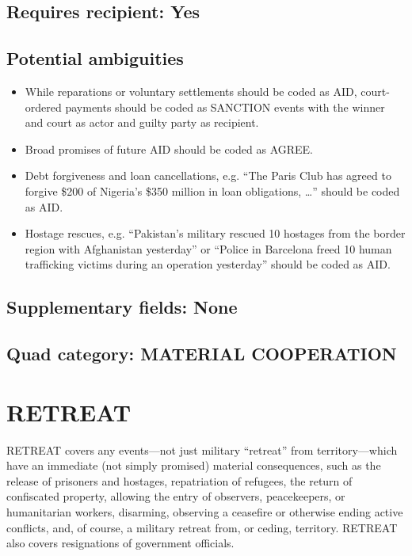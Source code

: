 \documentclass[11pt]{report}
\newcommand{\plcat}[1]{\textsf{#1}}
\begin{document}
\subsection{Requires recipient: Yes}

\subsection{Potential ambiguities}

\begin{itemize}
\item While reparations or voluntary settlements should be coded as \plcat{AID}, court-ordered payments should be coded as \plcat{SANCTION} events with the winner and court as actor and guilty party as recipient.
\item Broad promises of future \plcat{AID} should be coded as \plcat{AGREE}.
\item Debt forgiveness and loan cancellations, e.g. ``The Paris Club has agreed to forgive \$200 of Nigeria’s \$350 million in loan obligations, \dots'' should be coded as \plcat{AID}.
\item Hostage rescues, e.g. ``Pakistan’s military rescued 10 hostages from the border region with Afghanistan yesterday'' or ``Police in Barcelona freed 10 human trafficking victims during an operation yesterday'' should be coded as \plcat{AID}.
\end{itemize}

\subsection{Supplementary fields: None}

\subsection{Quad category: MATERIAL COOPERATION}

\newpage

\section{RETREAT}

\plcat{RETREAT} covers any events---not just military ``retreat'' from territory---which have an immediate (not simply promised) material consequences, such as the release of prisoners and hostages, repatriation of refugees, the return of  confiscated property, allowing the entry of observers, peacekeepers, or humanitarian workers, disarming, observing a ceasefire or otherwise ending active conflicts, and, of course, a military retreat from, or ceding, territory. \plcat{RETREAT} also covers resignations of government officials.
\end{document}
